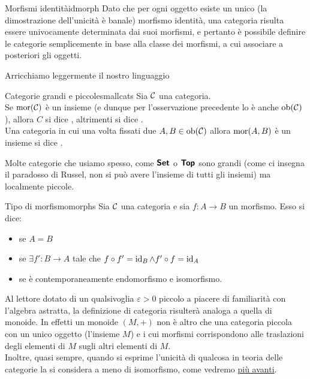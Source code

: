 \documentclass{article}
\begin{document}
\begin{observation}{Morfismi identità}{idmorph}
    Dato che per ogni oggetto esiste un unico (la dimostrazione dell'unicità è banale) morfismo identità, una categoria risulta essere univocamente determinata dai suoi morfismi, e pertanto è possibile definire le categorie semplicemente in base alla classe dei morfismi, a cui associare a posteriori gli oggetti.
\end{observation}

Arricchiamo leggermente il nostro linguaggio

\begin{definition}{Categorie grandi e piccole}{smallcats}
    Sia $\mathcal{C}$ una categoria.\\
    Se $\operatorname{mor}(\mathcal{C})$ è un insieme (e dunque per l'osservazione precedente lo è anche $\operatorname{ob}(\mathcal{C})$), allora $C$ si dice , altrimenti si dice .\\
    Una categoria in cui una volta fissati due $A,B \in \operatorname{ob}(\mathcal{C})$ allora $\operatorname{mor}(A,B)$ è un insieme si dice .
\end{definition}

Molte categorie che usiamo spesso, come $\text{\sffamily\textbf{Set}}$ o $\text{\sffamily\textbf{Top}}$ sono grandi (come ci insegna il paradosso di Russel, non si può avere l'insieme di tutti gli insiemi) ma localmente piccole.

\begin{definition}{Tipo di morfismo}{morphs}
    Sia $\mathcal{C}$ una categoria e sia $f:A\to B$ un morfismo. Esso si dice:\begin{itemize}
        \item {} se $A=B$
        \item {} se $\exists f' : B\to A$ tale che $f \circ f' = \operatorname{id}_{B} \wedge f' \circ f = \operatorname{id}_{A}$
        \item {} se è contemporaneamente endomorfismo e isomorfismo.
    \end{itemize}
\end{definition}

Al lettore dotato di un qualsivoglia $\varepsilon > 0$ piccolo a piacere di familiarità con l'algebra astratta, la definizione di categoria risulterà analoga a quella di monoide. In effetti un monoide $(M,+)$ non è altro che una categoria piccola con un unico oggetto (l'insieme $M$) e i cui morfismi corrispondono alle traslazioni degli elementi di $M$ sugli altri elementi di $M$.\\ Inoltre, quasi sempre, quando si esprime l'unicità di qualcosa in teoria delle categorie la si considera a meno di isomorfismo, come vedremo \hyperref[sec:Universal]{più avanti}.
\end{document}
